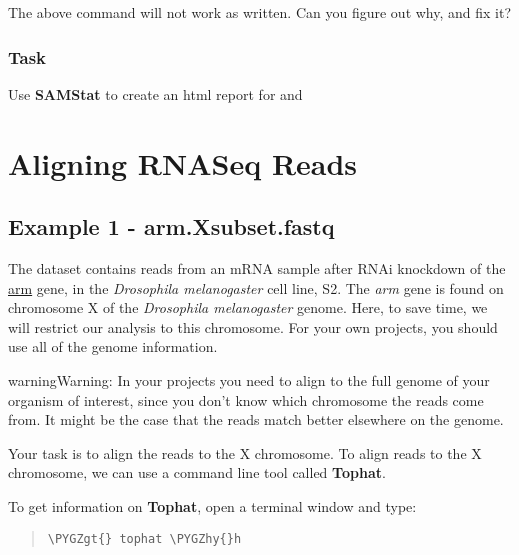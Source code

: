 \documentclass[a4paper,11pt,english]{sphinxmanual}
\def\PYGZgt{\char`\>}
\def\PYGZhy{\char`\-}
\begin{document}
The above command will not work as written. Can you figure out why, and fix it?


\subsection{Task}
\label{exercises/STEP1_QualityControl:id1}
Use \textbf{SAMStat} to create an html report for  and 


\chapter{Aligning RNASeq Reads}
\label{exercises/STEP2_alignRNASeqReads:tophat}\label{exercises/STEP2_alignRNASeqReads::doc}\label{exercises/STEP2_alignRNASeqReads:aligning-rnaseq-reads}

\section{Example 1 - arm.Xsubset.fastq}
\label{exercises/STEP2_alignRNASeqReads:example-1-arm-xsubset-fastq}
The dataset  contains reads from an mRNA sample after RNAi knockdown of the \href{http://flybase.org/reports/FBgn0000117.html}{arm} gene, in the \emph{Drosophila melanogaster} cell line, S2. The \emph{arm} gene is found on chromosome X of the \emph{Drosophila melanogaster} genome. Here, to save time, we will restrict our analysis to this chromosome. For your own projects, you should use all of the genome information.

\begin{notice}{warning}{Warning:}
In your projects you need to align to the full genome of your organism of interest, since you don't know which chromosome the reads come from. It might be the case that the reads match better elsewhere on the genome.
\end{notice}

Your task is to align the reads to the X chromosome. To align reads to the X chromosome, we can use a command line tool called \textbf{Tophat}.

To get information on \textbf{Tophat}, open a terminal window and type:
\begin{quote}

\begin{Verbatim}[frame=single, rulecolor=\color{lightgray}, fontfamily=courier, commandchars=\\\{\}]
\PYGZgt{} tophat \PYGZhy{}h
\end{Verbatim}
\end{quote}
\end{document}
